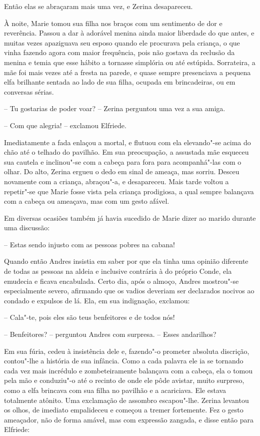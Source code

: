 Então elas se abraçaram mais uma vez, e Zerina desapareceu.

À noite, Marie tomou sua filha nos braços com um sentimento de dor e
reverência. Passou a dar à adorável menina ainda maior liberdade do que
antes, e muitas vezes apaziguava seu esposo quando ele procurava pela
criança, o que vinha fazendo agora com maior frequência, pois não
gostava da reclusão da menina e temia que esse hábito a tornasse
simplória ou até estúpida. Sorrateira, a mãe foi mais vezes até a
fresta na parede, e quase sempre presenciava a pequena elfa brilhante
sentada ao lado de sua filha, ocupada em brincadeiras, ou em conversas sérias.

-- Tu gostarias de poder voar? -- Zerina perguntou uma vez a sua amiga.

-- Com que alegria! -- exclamou Elfriede.

Imediatamente a fada enlaçou a mortal, e flutuou com ela elevando"-se
acima do chão até o telhado do pavilhão. Em sua preocupação, a
assustada mãe esqueceu sua cautela e inclinou"-se com a cabeça para fora
para acompanhá"-las com o olhar. Do alto, Zerina ergueu o dedo em sinal
de ameaça, mas sorriu. Desceu novamente com a criança, abraçou"-a, e
desapareceu. Mais tarde voltou a repetir"-se que Marie fosse vista pela
criança prodigiosa, a qual sempre balançava com a cabeça ou ameaçava,
mas com um gesto afável.

Em diversas ocasiões também já havia sucedido de Marie dizer ao marido
durante uma discussão:

-- Estas sendo injusto com as pessoas pobres na cabana!

Quando então Andres insistia em saber por que ela tinha uma opinião
diferente de todas as pessoas na aldeia e inclusive contrária à do
próprio Conde, ela emudecia e ficava encabulada. Certo dia, após o
almoço, Andres mostrou"-se especialmente severo, afirmando que os vadios
deveriam ser declarados nocivos ao condado e expulsos de lá. Ela, em
sua indignação, exclamou:

-- Cala"-te, pois eles são teus benfeitores e de todos nós!

-- Benfeitores? -- perguntou Andres com surpresa. -- Esses andarilhos?

Em sua fúria, cedeu à insistência dele e, fazendo"-o prometer absoluta
discrição, contou"-lhe a história de sua infância. Como a cada palavra
ele ia se tornando cada vez mais incrédulo e zombeteiramente balançava
com a cabeça, ela o tomou pela mão e conduziu"-o até o recinto de onde
ele pôde avistar, muito surpreso, como a elfa brincava com sua filha no
pavilhão e a acariciava. Ele estava totalmente atônito. Uma exclamação
de assombro escapou"-lhe. Zerina levantou os olhos, de imediato
empalideceu e começou a tremer fortemente. Fez o gesto ameaçador, não
de forma amável, mas com expressão zangada, e disse então para Elfriede:

